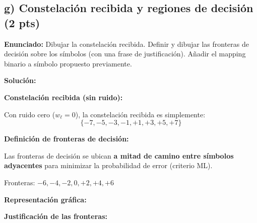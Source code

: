 \documentclass[11pt,a4paper]{article}
\begin{document}
\subsection*{g) Constelaci\'on recibida y regiones de decisi\'on (2 pts)}

\textbf{Enunciado:} Dibujar la constelaci\'on recibida. Definir y dibujar las fronteras de decisi\'on sobre los s\'imbolos (con una frase de justificaci\'on). A\~nadir el mapping binario a s\'imbolo propuesto previamente.

\vspace{0.3cm}
\textbf{Soluci\'on:}

\textbf{Constelaci\'on recibida (sin ruido):}

Con ruido cero ($w_\ell = 0$), la constelaci\'on recibida es simplemente:
\[
\{-7, -5, -3, -1, +1, +3, +5, +7\}
\]

\textbf{Definici\'on de fronteras de decisi\'on:}

Las fronteras de decisi\'on se ubican \textbf{a mitad de camino entre s\'imbolos adyacentes} para minimizar la probabilidad de error (criterio ML).

Fronteras: $-6, -4, -2, 0, +2, +4, +6$

\textbf{Representaci\'on gr\'afica:}

\begin{center}
\end{center}

\textbf{Justificaci\'on de las fronteras:}
\end{document}

